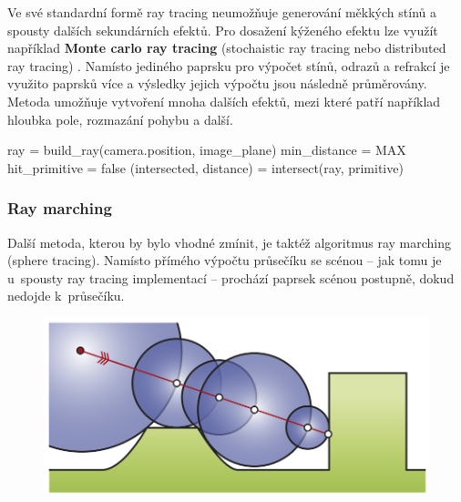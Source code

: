 Ve své standardní formě ray tracing neumožňuje generování měkkých stínů a spousty dalších sekundárních efektů.  Pro dosažení kýženého efektu lze využít například \textbf{Monte carlo ray tracing} (stochaistic ray tracing nebo distributed ray tracing) \cite{distributed_rt}. Namísto jediného paprsku pro výpočet stínů, odrazů a refrakcí je využito paprsků více a výsledky jejich výpočtu jsou následně průměrovány. Metoda umožňuje vytvoření mnoha dalších efektů, mezi které patří například hloubka pole, rozmazání pohybu a další.

\begin{center}
	\begin{czechalgorithm}[H] \label{alg:rt_1}
		ray = build\_ray(camera.position, image\_plane)\;
		min\_distance = MAX\;
		hit\_primitive = false\;
		 {
			(intersected, distance) = intersect(ray, primitive)\;
		}
		\caption{Ray tracing}
	\end{czechalgorithm}
\end{center}

\subsubsection{Ray marching}
Další metoda, kterou by bylo vhodné zmínit, je taktéž algoritmus ray marching (sphere tracing). Namísto přímého výpočtu průsečíku se scénou -- jak tomu je u~spousty ray tracing implementací -- prochází paprsek scénou postupně, dokud nedojde k~průsečíku.

\begin{figure}[H]
	\centering
	\captionsetup{justification=centering}
	\includegraphics[scale=0.8]{obrazky-figures/ray_marching.png}
	\label{fig:ray_marching}
\end{figure}

